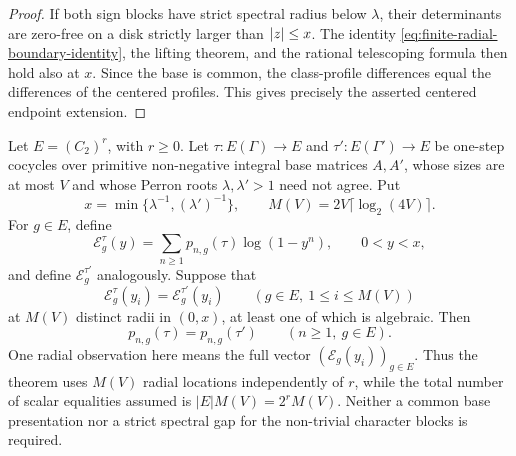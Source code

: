 \begin{proof}
If both sign blocks have strict spectral radius below \(\lambda\), their
determinants are zero-free on a disk strictly larger than \(\lvert z \rvert\le x\).
The identity \eqref{eq:finite-radial-boundary-identity}, the lifting theorem,
and the rational telescoping formula then hold also at \(x\).  Since the base
is common, the class-profile differences equal the differences of the centered
profiles.  This gives precisely the asserted centered endpoint extension.
\end{proof}

\begin{theorem}
\label{thm:elementary-two-group-finite-sampling}
Let \(E=(C_2)^r\), with \(r\ge0\).  Let
\(\tau:E(\Gamma)\to E\) and \(\tau':E(\Gamma')\to E\) be one-step
cocycles over primitive non-negative integral base matrices \(A,A'\), whose
sizes are at most \(V\) and whose Perron roots \(\lambda,\lambda'>1\) need
not agree.  Put
\[
 x=\min\{\lambda^{-1},(\lambda')^{-1}\},
 \qquad M(V)=2V\lceil\log_2(4V)\rceil.
\]
For \(g\in E\), define
\[
 \mathcal E_g^\tau(y)=\sum_{n\ge1}p_{n,g}(\tau)\log(1-y^n),
 \qquad 0<y<x,
\]
and define \(\mathcal E_g^{\tau'}\) analogously.  Suppose that
\[
 \mathcal E_g^\tau(y_i)=\mathcal E_g^{\tau'}(y_i)
 \qquad(g\in E,\ 1\le i\le M(V))
\]
at \(M(V)\) distinct radii in \((0,x)\), at least one of which is
  algebraic.  Then
\[
 p_{n,g}(\tau)=p_{n,g}(\tau')
 \qquad(n\ge1,\ g\in E).
\]
One radial observation here means the full vector
\((\mathcal E_g(y_i))_{g\in E}\).  Thus the theorem uses \(M(V)\)
radial locations independently of \(r\), while the total number of scalar
equalities assumed is \(|E|M(V)=2^rM(V)\).  Neither a common base
presentation nor a strict spectral gap for the non-trivial character blocks
is required.
\end{theorem}

